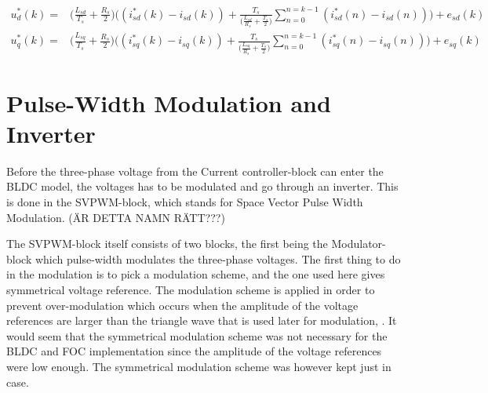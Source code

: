 \documentclass{LTHthesis}
\begin{document}
\begin{subequations} \label{current_control_dq}
\begin{align}
u_d^*(k)=&\bigg(\frac{L_{sd}}{T_s}+\frac{R_s}{2}\bigg)\bigg((i_{sd}^*(k)-i_{sd}(k))+\frac{T_s}{\big(\frac{L_{sd}}{R_s}+\frac{T_s}{2}\big)}\sum\limits_{n=0}^{n=k-1}(i_{sd}^*(n)-i_{sd}(n))\bigg)+e_{sd}(k)\\
u_q^*(k)=&\bigg(\frac{L_{sq}}{T_s}+\frac{R_s}{2}\bigg)\bigg((i_{sq}^*(k)-i_{sq}(k))+\frac{T_s}{\big(\frac{L_{sq}}{R_s}+\frac{T_s}{2}\big)}\sum\limits_{n=0}^{n=k-1}(i_{sq}^*(n)-i_{sq}(n))\bigg)+e_{sq}(k)
\end{align}
\end{subequations}

\section{Pulse-Width Modulation and Inverter}
Before the three-phase voltage from the Current controller-block can enter the BLDC model, the voltages has to be modulated and go through an inverter. This is done in the SVPWM-block, which stands for Space Vector Pulse Width Modulation. (ÄR DETTA NAMN RÄTT???)

The SVPWM-block itself consists of two blocks, the first being the Modulator-block which pulse-width modulates the three-phase voltages. The first thing to do in the modulation is to pick a modulation scheme, and the one used here gives symmetrical voltage reference. The modulation scheme is applied in order to prevent over-modulation which occurs when the amplitude of the voltage references are larger than the triangle wave that is used later for modulation, \cite{ala_kar2014}. It would seem that the symmetrical modulation scheme was not necessary for the BLDC and FOC implementation since the amplitude of the voltage references were low enough. The symmetrical modulation scheme was however kept just in case.
\end{document}
